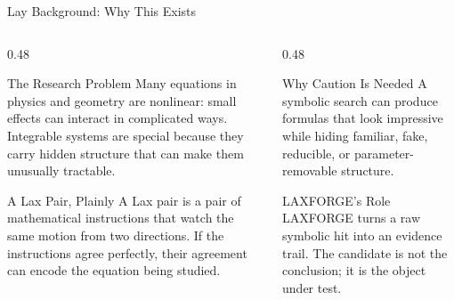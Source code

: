 \documentclass[aspectratio=169,11pt]{beamer}
\begin{document}
\begin{frame}{Lay Background: Why This Exists}
  \begin{columns}[T,totalwidth=\textwidth]
    \begin{column}{0.48\textwidth}
      \begin{block}{The Research Problem}
        Many equations in physics and geometry are nonlinear: small effects can
        interact in complicated ways. Integrable systems are special because
        they carry hidden structure that can make them unusually tractable.
      \end{block}
      \begin{block}{A Lax Pair, Plainly}
        A Lax pair is a pair of mathematical instructions that watch the same
        motion from two directions. If the instructions agree perfectly, their
        agreement can encode the equation being studied.
      \end{block}
    \end{column}
    \begin{column}{0.48\textwidth}
      \begin{alertblock}{Why Caution Is Needed}
        A symbolic search can produce formulas that look impressive while
        hiding familiar, fake, reducible, or parameter-removable structure.
      \end{alertblock}
      \begin{block}{LAXFORGE's Role}
        LAXFORGE turns a raw symbolic hit into an evidence trail. The candidate
        is not the conclusion; it is the object under test.
      \end{block}
    \end{column}
  \end{columns}
\end{frame}
\end{document}
